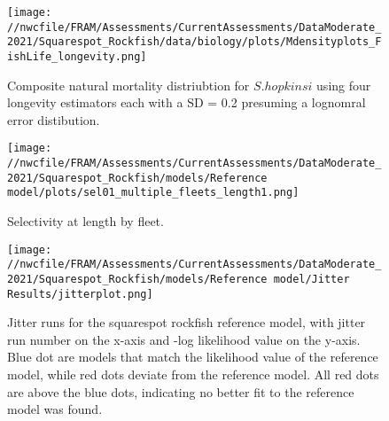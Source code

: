 \documentclass[11pt,
  english,
  a4paper,
]{article}
\begin{document}
\tagmcend\tagstructend


\begin{figure}
\centering
\texttt{[image: //nwcfile/FRAM/Assessments/CurrentAssessments/DataModerate\_2021/Squarespot\_Rockfish/data/biology/plots/Mdensityplots\_FishLife\_longevity.png]}
\caption{Composite natural mortality distriubtion for {\(S. hopkinsi\)\leavevmode\tagmcend\tagstructend} using four longevity estimators each with a SD = 0.2 presuming a lognomral error distibution.\label{fig:M_composite_dists}}
\end{figure}

\tagmcend\tagstructend


\begin{figure}
\centering
\texttt{[image: //nwcfile/FRAM/Assessments/CurrentAssessments/DataModerate\_2021/Squarespot\_Rockfish/models/Reference model/plots/sel01\_multiple\_fleets\_length1.png]}
\caption{Selectivity at length by fleet.\label{fig:selex}}
\end{figure}

\tagmcend\tagstructend


\begin{figure}
\centering
\texttt{[image: //nwcfile/FRAM/Assessments/CurrentAssessments/DataModerate\_2021/Squarespot\_Rockfish/models/Reference model/Jitter Results/jitterplot.png]}
\caption{Jitter runs for the squarespot rockfish reference model, with jitter run number on the x-axis and -log likelihood value on the y-axis. Blue dot are models that match the likelihood value of the reference model, while red dots deviate from the reference model. All red dots are above the blue dots, indicating no better fit to the reference model was found.\label{fig:jitter_01}}
\end{figure}
\end{document}
